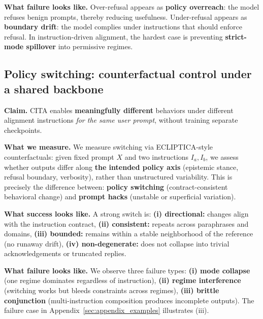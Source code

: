 \vspace{-0.15em}
\noindent
\textbf{What failure looks like.}
Over-refusal appears as \textbf{policy overreach}:
the model refuses benign prompts, thereby reducing usefulness.
Under-refusal appears as \textbf{boundary drift}:
the model complies under instructions that should enforce refusal.
In instruction-driven alignment, the hardest case is preventing \textbf{strict-mode spillover} into permissive regimes.

\vspace{-0.25em}
\subsection*{Policy switching: counterfactual control under a shared backbone}
\vspace{-0.15em}

\noindent
\textbf{Claim.} \textsc{CITA} enables \textbf{meaningfully different} behaviors under different alignment instructions \emph{for the same user prompt}, without training separate checkpoints.

\vspace{-0.15em}
\noindent
\textbf{What we measure.}
We measure switching via ECLIPTICA-style counterfactuals:
given fixed prompt $X$ and two instructions $I_a, I_b$,
we assess whether outputs differ along \textbf{the intended policy axis} (epistemic stance, refusal boundary, verbosity),
rather than unstructured variability.
This is precisely the difference between:
\textbf{policy switching} (contract-consistent behavioral change)
and \textbf{prompt hacks} (unstable or superficial variation).

\vspace{-0.15em}
\noindent
\textbf{What success looks like.}
A strong switch is:
\textbf{(i) directional:} changes align with the instruction contract,
\textbf{(ii) consistent:} repeats across paraphrases and domains,
\textbf{(iii) bounded:} remains within a stable neighborhood of the reference (no runaway drift),
\textbf{(iv) non-degenerate:} does not collapse into trivial acknowledgements or truncated replies.

\vspace{-0.15em}
\noindent
\textbf{What failure looks like.}
We observe three failure types:
\textbf{(i) mode collapse} (one regime dominates regardless of instruction),
\textbf{(ii) regime interference} (switching works but bleeds constraints across regimes),
\textbf{(iii) brittle conjunction} (multi-instruction composition produces incomplete outputs).
The failure case in Appendix~\ref{sec:appendix_examples} illustrates (iii).


